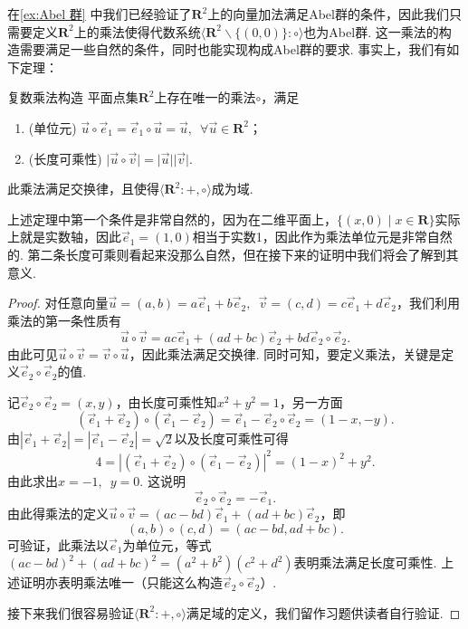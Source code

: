 在\autoref{ex:Abel 群} 中我们已经验证了$\mathbf{R}^2$上的向量加法满足Abel群的条件，因此我们只需要定义$\mathbf{R}^2$上的乘法使得代数系统$\langle\mathbf{R}^2\backslash\{(0,0)\}:\circ\rangle$也为Abel群. 这一乘法的构造需要满足一些自然的条件，同时也能实现构成Abel群的要求. 事实上，我们有如下定理：
\begin{theorem}{}{复数乘法构造}
    平面点集$\mathbf{R}^2$上存在唯一的乘法$\circ$，满足
    \begin{enumerate}
        \item (单位元) $\vec{u}\circ\vec{e}_1=\vec{e}_1\circ\vec{u}=\vec{u},\enspace\forall\vec{u}\in\mathbf{R}^2$；

        \item (长度可乘性) $\lvert\vec{u}\circ\vec{v}\rvert=\lvert\vec{u}\rvert\lvert\vec{v}\rvert$.
    \end{enumerate}
    此乘法满足交换律，且使得$\langle\mathbf{R}^2:+,\circ\rangle$成为域.
\end{theorem}

上述定理中第一个条件是非常自然的，因为在二维平面上，$\{(x,0) \mid x\in\mathbf{R}\}$实际上就是实数轴，因此$\vec{e}_1=(1,0)$相当于实数1，因此作为乘法单位元是非常自然的. 第二条长度可乘则看起来没那么自然，但在接下来的证明中我们将会了解到其意义.

\begin{proof}
    对任意向量$\vec{u}=(a,b)=a\vec{e}_1+b\vec{e}_2,\enspace \vec{v}=(c,d)=c\vec{e}_1+d\vec{e}_2$，我们利用乘法的第一条性质有
    \[\vec{u}\circ\vec{v}=ac\vec{e}_1+(ad+bc)\vec{e}_2+bd\vec{e}_2\circ\vec{e}_2.\]
    由此可见$\vec{u}\circ\vec{v}=\vec{v}\circ\vec{u}$，因此乘法满足交换律. 同时可知，要定义乘法，关键是定义$\vec{e}_2\circ\vec{e}_2$的值.

    记$\vec{e}_2\circ\vec{e}_2=(x,y)$，由长度可乘性知$x^2+y^2=1$，另一方面
    \[(\vec{e}_1+\vec{e}_2)\circ(\vec{e}_1-\vec{e}_2)=\vec{e}_1-\vec{e}_2\circ\vec{e}_2=(1-x,-y).\]
    由$|\vec{e}_1+\vec{e}_2|=|\vec{e}_1-\vec{e}_2|=\sqrt{2}$以及长度可乘性可得
    \[4=|(\vec{e}_1+\vec{e}_2)\circ(\vec{e}_1-\vec{e}_2)|^2=(1-x)^2+y^2.\]
    由此求出$x=-1,\enspace y=0$. 这说明
    \[\vec{e}_2\circ\vec{e}_2=-\vec{e}_1.\]
    由此得乘法的定义$\vec{u}\circ\vec{v}=(ac-bd)\vec{e}_1+(ad+bc)\vec{e}_2$，即
    \[(a,b)\circ(c,d)=(ac-bd,ad+bc).\]
    可验证，此乘法以$\vec{e}_1$为单位元，等式$(ac-bd)^2+(ad+bc)^2=(a^2+b^2)(c^2+d^2)$表明乘法满足长度可乘性. 上述证明亦表明乘法唯一（只能这么构造$\vec{e}_2\circ\vec{e}_2$）.

    接下来我们很容易验证$\langle\mathbf{R}^2:+,\circ\rangle$满足域的定义，我们留作习题供读者自行验证.
\end{proof}

